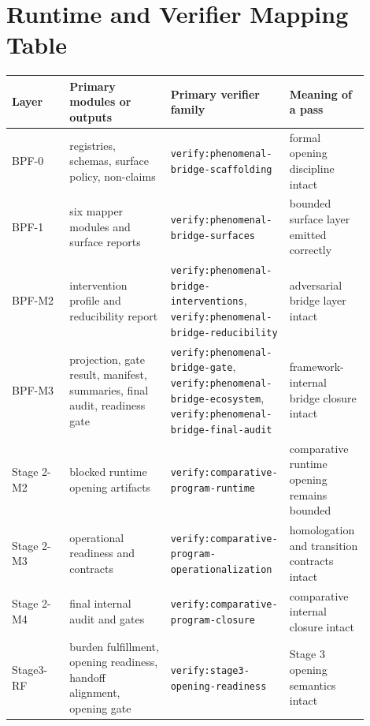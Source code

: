 \documentclass[11pt,a4paper]{article}
\theoremstyle{definition}
\begin{document}
\section{Runtime and Verifier Mapping Table}
\begin{center}
\small
\begin{tabularx}{\linewidth}{@{}p{0.16\linewidth}p{0.28\linewidth}p{0.24\linewidth}p{0.22\linewidth}@{}}
\toprule
Layer & Primary modules or outputs & Primary verifier family & Meaning of a pass \\
\midrule
BPF-0 & registries, schemas, surface policy, non-claims & \texttt{verify:phenomenal-bridge-scaffolding} & formal opening discipline intact \\
BPF-1 & six mapper modules and surface reports & \texttt{verify:phenomenal-bridge-surfaces} & bounded surface layer emitted correctly \\
BPF-M2 & intervention profile and reducibility report & \texttt{verify:phenomenal-bridge-interventions}, \texttt{verify:phenomenal-bridge-reducibility} & adversarial bridge layer intact \\
BPF-M3 & projection, gate result, manifest, summaries, final audit, readiness gate & \texttt{verify:phenomenal-bridge-gate}, \texttt{verify:phenomenal-bridge-ecosystem}, \texttt{verify:phenomenal-bridge-final-audit} & framework-internal bridge closure intact \\
Stage 2-M2 & blocked runtime opening artifacts & \texttt{verify:comparative-program-runtime} & comparative runtime opening remains bounded \\
Stage 2-M3 & operational readiness and contracts & \texttt{verify:comparative-program-operationalization} & homologation and transition contracts intact \\
Stage 2-M4 & final internal audit and gates & \texttt{verify:comparative-program-closure} & comparative internal closure intact \\
Stage3-RF & burden fulfillment, opening readiness, handoff alignment, opening gate & \texttt{verify:stage3-opening-readiness} & Stage 3 opening semantics intact \\
\bottomrule
\end{tabularx}
\end{center}
\end{document}
